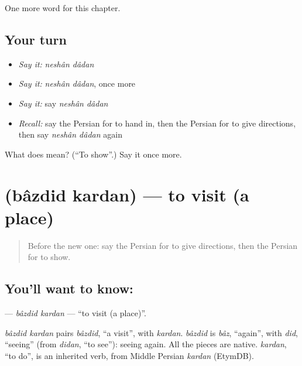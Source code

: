 \begin{grammarlens}[title={What you've built}]
One more word for this chapter.
\end{grammarlens}

\subsection*{Your turn}
\begin{itemize}
\raggedright
  \item \emph{Say it:} \emph{neshân dâdan}
  \item \emph{Say it:} \emph{neshân dâdan}, once more
  \item \emph{Say it:} say \emph{neshân dâdan}
  \item \emph{Recall:} say the Persian for to hand in, then the Persian for to give directions, then say \emph{neshân dâdan} again
\end{itemize}

\begin{tcolorbox}[breakable,colback=teal!4,colframe=teal!35!black,title={Before you move on}]
What does   mean? (\textquotedblleft{}To show\textquotedblright{}.) Say it once more.
\end{tcolorbox}
\section[\texorpdfstring{\fa{بازدید} \fa{کردن} (bâzdid kardan)}{بازدید کردن (bâzdid kardan)}]{  (bâzdid kardan) — to visit (a place)}

\label{lesson:FA-C144-bazdid-kardan}



\begin{quote}
Before the new one: say the Persian for to give directions, then the Persian for to show.
\end{quote}

\subsection*{You'll want to know:  }
\textbf{ } — \emph{bâzdid kardan} — \textquotedblleft{}to visit (a place)\textquotedblright{}.

\begin{cousinweb}
\emph{bâzdid kardan} pairs \emph{bâzdid}, \textquotedblleft{}a visit\textquotedblright{}, with \emph{kardan}. \emph{bâzdid} is \emph{bâz}, \textquotedblleft{}again\textquotedblright{}, with \emph{did}, \textquotedblleft{}seeing\textquotedblright{} (from \emph{didan}, \textquotedblleft{}to see\textquotedblright{}): seeing again. All the pieces are native. \emph{kardan}, \textquotedblleft{}to do\textquotedblright{}, is an inherited verb, from Middle Persian \emph{kardan} (EtymDB).
\end{cousinweb}

